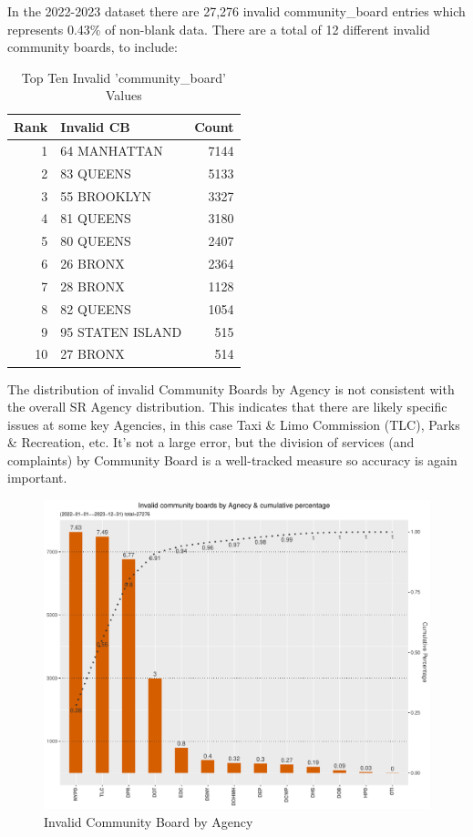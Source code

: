 \documentclass[12pt, titlepage]{article}
\begin{document}
{	In the 2022-2023 dataset there are 27,276 invalid community\_board 
	entries which represents 0.43\% of non-blank data. There are a total 
	of 12 different invalid community boards, to include: 
	
		\begin{table}[tbp]
		\centering
		\normalsize
		\caption{Top Ten Invalid 'community\_board' Values}
		\begin{tabular}{rlr}
		\toprule
		\textbf{Rank} & \textbf{Invalid CB} & \textbf{Count} \\
			\midrule
				1 & 64 MANHATTAN & 7144 \\
				2 & 83 QUEENS & 5133 \\
				3 & 55 BROOKLYN & 3327 \\
				4 & 81 QUEENS & 3180 \\
				5 & 80 QUEENS & 2407 \\
				6 & 26 BRONX & 2364 \\
				7 & 28 BRONX & 1128 \\
				8 & 82 QUEENS & 1054 \\
				9 & 95 STATEN ISLAND & 515 \\
				10 & 27 BRONX & 514 \\
			\bottomrule
		\end{tabular}
		\end{table}
		
		The distribution of invalid Community Boards by Agency is not consistent 
		with the overall SR Agency distribution. This indicates that there are likely 
		specific issues at some key Agencies, in this case Taxi \& Limo Commission 
		(TLC), Parks \& Recreation, etc. It's not a large error, but the 
		division of services (and complaints) by Community Board is a 
		well-tracked measure so accuracy is again important.

		\begin{figure}[tbp]
	 	 \centering
		  \includegraphics[width = \textwidth]{invalid_community_boards.pdf}
		  \caption{Invalid Community Board by Agency}
		  \label{fig:invalid_community_boards}
		\end{figure}


}
\end{document}
